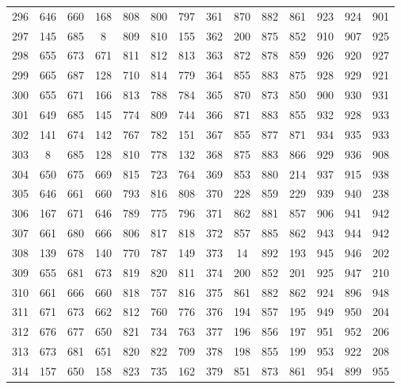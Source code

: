 \begin{apendicesenv}
\begin{table}[H]
\begin{tabular}{@{}ccccccc@{\hspace{1.0cm}}ccccccc@{}}
		296 &  646 &  660 &  168 &  808 &  800 &  797 & 361 &  870 &  882 &  861 &  923 &  924 &  901 \\
		297 &  145 &  685 &    8 &  809 &  810 &  155 & 362 &  200 &  875 &  852 &  910 &  907 &  925 \\
		298 &  655 &  673 &  671 &  811 &  812 &  813 & 363 &  872 &  878 &  859 &  926 &  920 &  927 \\
		299 &  665 &  687 &  128 &  710 &  814 &  779 & 364 &  855 &  883 &  875 &  928 &  929 &  921 \\
		300 &  655 &  671 &  166 &  813 &  788 &  784 & 365 &  870 &  873 &  850 &  900 &  930 &  931 \\
		301 &  649 &  685 &  145 &  774 &  809 &  744 & 366 &  871 &  883 &  855 &  932 &  928 &  933 \\
		302 &  141 &  674 &  142 &  767 &  782 &  151 & 367 &  855 &  877 &  871 &  934 &  935 &  933 \\
		303 &    8 &  685 &  128 &  810 &  778 &  132 & 368 &  875 &  883 &  866 &  929 &  936 &  908 \\
		304 &  650 &  675 &  669 &  815 &  723 &  764 & 369 &  853 &  880 &  214 &  937 &  915 &  938 \\
		305 &  646 &  661 &  660 &  793 &  816 &  808 & 370 &  228 &  859 &  229 &  939 &  940 &  238 \\
		306 &  167 &  671 &  646 &  789 &  775 &  796 & 371 &  862 &  881 &  857 &  906 &  941 &  942 \\
		307 &  661 &  680 &  666 &  806 &  817 &  818 & 372 &  857 &  885 &  862 &  943 &  944 &  942 \\
		308 &  139 &  678 &  140 &  770 &  787 &  149 & 373 &   14 &  892 &  193 &  945 &  946 &  202 \\
		309 &  655 &  681 &  673 &  819 &  820 &  811 & 374 &  200 &  852 &  201 &  925 &  947 &  210 \\
		310 &  661 &  666 &  660 &  818 &  757 &  816 & 375 &  861 &  882 &  862 &  924 &  896 &  948 \\
		311 &  671 &  673 &  662 &  812 &  760 &  776 & 376 &  194 &  857 &  195 &  949 &  950 &  204 \\
		312 &  676 &  677 &  650 &  821 &  734 &  763 & 377 &  196 &  856 &  197 &  951 &  952 &  206 \\
		313 &  673 &  681 &  651 &  820 &  822 &  709 & 378 &  198 &  855 &  199 &  953 &  922 &  208 \\
		314 &  157 &  650 &  158 &  823 &  735 &  162 & 379 &  851 &  873 &  861 &  954 &  899 &  955 \\

\end{tabular}
\end{table}
\end{apendicesenv}
